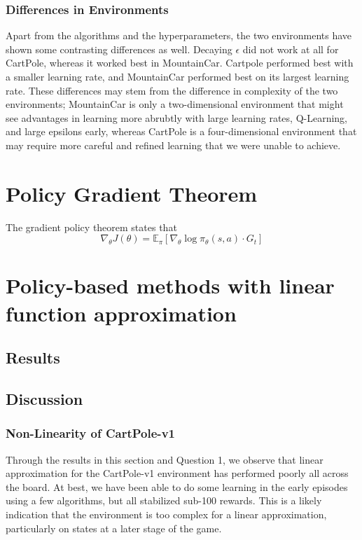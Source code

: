 \documentclass{article in the early stages}
\begin{document}
\subsubsection{Differences in Environments}
Apart from the algorithms and the hyperparameters, the two environments have shown some
contrasting differences as well. Decaying $\epsilon$ did not work at all for CartPole, whereas
it worked best in MountainCar. Cartpole performed best with a smaller learning rate, and
MountainCar performed best on its largest learning rate. These differences may stem from the
difference in complexity of the two environments; MountainCar is only a two-dimensional environment
that might see advantages in learning more abrubtly with large learning rates, Q-Learning, and large epsilons early, whereas CartPole is a four-dimensional environment
that may require more careful and refined learning that we were unable to achieve.

\section{Policy Gradient Theorem}

The gradient policy theorem states that
\[
  \nabla_\theta J(\theta) = \mathbb{E}_{\pi} \left[ \nabla_{\theta} \log \pi_{\theta}(s, a) \cdot G_t \right]
\]









\section{Policy-based methods with linear function approximation}

\subsection{Results}

\subsection{Discussion}


\subsubsection{Non-Linearity of CartPole-v1}

Through the results in this section and Question 1, we observe that linear approximation
for the CartPole-v1 environment has performed poorly all across the board. At best, we have been
able to do some learning in the early episodes using a few algorithms, but all stabilized
sub-100 rewards. This is a likely indication that the environment is too complex for a linear
approximation, particularly on states at a later stage of the game.
\end{document}
